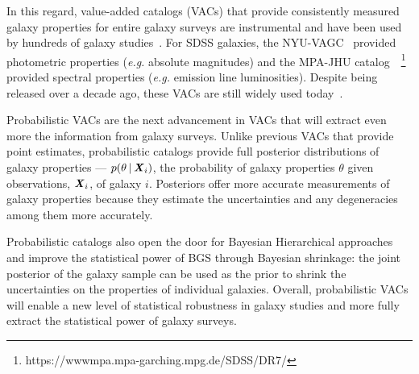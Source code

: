 In this regard, value-added catalogs (VACs) that provide consistently measured
galaxy properties for entire galaxy surveys are instrumental and have been
used by hundreds of galaxy studies~\citep[see][for a review]{blanton2009}.
For SDSS galaxies, the NYU-VAGC~\citep{blanton2005} provided photometric
properties (\emph{e.g.} absolute magnitudes) and the MPA-JHU
catalog~~\citep{brinchmann2004}\footnote{https://wwwmpa.mpa-garching.mpg.de/SDSS/DR7/}
provided spectral properties (\emph{e.g.} emission line luminosities).
Despite being released over a decade ago, these VACs are still widely used
today~\citep[\emph{e.g.}][]{alpaslan2021, odonnell2021, trevisan2021}. 

Probabilistic VACs are the next advancement in VACs that will extract even more
the information from galaxy surveys. 
Unlike previous VACs that provide point estimates, probabilistic catalogs
provide full posterior distributions of galaxy properties ---
$p(\theta\,|\,{\textbf{\textit{X}}_i})$, the probability of galaxy properties $\theta$
given observations, ${\textbf{\textit{X}}_i}$, of galaxy $i$.
Posteriors offer more accurate measurements of galaxy properties because they
estimate the uncertainties and any degeneracies among them more accurately. 

Probabilistic catalogs also open the door for Bayesian Hierarchical approaches
and improve the statistical power of BGS through Bayesian shrinkage: the joint
posterior of the galaxy sample can be used as the prior to shrink the
uncertainties on the properties of individual galaxies. 
Overall, probabilistic VACs will enable a new level of statistical robustness
in galaxy studies and more fully extract the statistical power of galaxy surveys.

